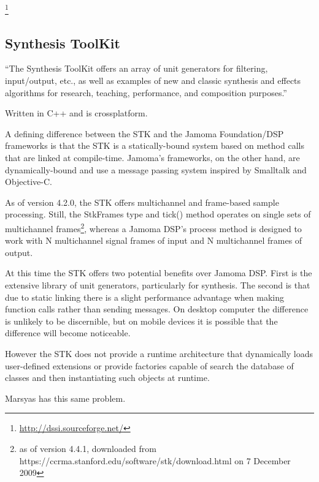 \documentclass[twoside,10pt]{article}
\begin{document}
\footnote{\url{http://dssi.sourceforge.net/}}


\subsection{Synthesis ToolKit} %

``The Synthesis ToolKit offers an array of unit generators for filtering, input/output, etc., as well as examples of new and classic synthesis and effects algorithms for research, teaching, performance, and composition purposes.''\cite{Cook:1999}

Written in C++ and is crossplatform.


A defining difference between the STK and the Jamoma Foundation/DSP frameworks is that the STK is a statically-bound system based on method calls that are linked at compile-time.  Jamoma's frameworks, on the other hand, are dynamically-bound and use a message passing system inspired by Smalltalk\cite{Krasner:1988} and Objective-C\cite{Cox:1986}.

As of version 4.2.0, the STK offers multichannel and frame-based sample processing\cite{Scavone:2005}. Still, the StkFrames type and tick() method operates on single sets of multichannel frames\footnote{as of version 4.4.1, downloaded from https://ccrma.stanford.edu/software/stk/download.html on 7 December 2009}, whereas a Jamoma DSP's process method is designed to work with N multichannel signal frames of input and N multichannel frames of output.

At this time the STK offers two potential benefits over Jamoma DSP.  First is the extensive library of unit generators, particularly for synthesis.  The second is that due to static linking there is a slight performance advantage when making function calls rather than sending messages.  On desktop computer the difference is unlikely to be discernible, but on mobile devices it is possible that the difference will become noticeable.

However the STK does not provide a runtime architecture that dynamically loads user-defined extensions or provide factories capable of search the database of classes and then instantiating such objects at runtime.

Marsyas has this same problem.  

\end{document}

